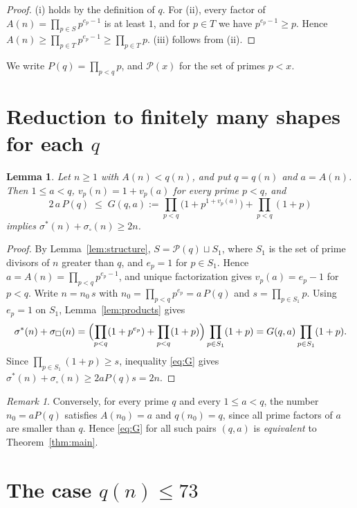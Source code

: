 \documentclass[11pt,a4paper]{amsart}
\newtheorem{lemma}[theorem]{Lemma}
\theoremstyle{definition}
\theoremstyle{remark}
\newtheorem{remark}[theorem]{Remark}
\newcommand{\usig}{\sigma^{*}}
\newcommand{\ssq}{\sigma_{\square}}
\begin{document}
\begin{proof}
(i) holds by the definition of $q$. For (ii), every factor of $A(n) = \prod_{p\in S}p^{e_p-1}$ is at least $1$, and for $p\in T$ we have $p^{e_p-1} \ge p$. Hence $A(n) \ge \prod_{p\in T}p^{e_p-1} \ge \prod_{p\in T}p$. (iii) follows from (ii).
\end{proof}

We write $P(q) = \prod_{p<q} p$, and $\mathcal{P}(x)$ for the set of primes $p<x$.

\section{Reduction to finitely many shapes for each \texorpdfstring{$q$}{q}}\label{sec:reduction}

\begin{lemma}\label{lem:reduction}
Let $n \ge 1$ with $A(n)<q(n)$, and put $q=q(n)$ and $a = A(n)$. Then $1 \le a < q$, $v_p(n) = 1 + v_p(a)$ for every prime $p<q$, and
\begin{equation}\label{eq:G}
  2\,a\,P(q) \;\le\; G(q,a) := \prod_{p<q}\bigl(1+p^{1+v_p(a)}\bigr) + \prod_{p<q}(1+p)
\end{equation}
implies $\usig(n)+\ssq(n) \ge 2n$.
\end{lemma}

\begin{proof}
By Lemma~\ref{lem:structure}, $S = \mathcal{P}(q) \sqcup S_1$, where $S_1$ is the set of prime divisors of $n$ greater than $q$, and $e_p = 1$ for $p\in S_1$. Hence $a = A(n) = \prod_{p<q}p^{e_p-1}$, and unique factorization gives $v_p(a) = e_p-1$ for $p<q$. Write $n = n_0\, s$ with $n_0 = \prod_{p<q}p^{e_p} = a\,P(q)$ and $s = \prod_{p\in S_1}p$. Using $e_p=1$ on $S_1$, Lemma~\ref{lem:products} gives
\[
  \usig(n) + \ssq(n) = \Bigl(\prod_{p<q}(1+p^{e_p}) + \prod_{p<q}(1+p)\Bigr)\prod_{p\in S_1}(1+p) = G(q,a)\prod_{p \in S_1}(1+p).
\]
Since $\prod_{p\in S_1}(1+p) \ge s$, inequality \eqref{eq:G} gives $\usig(n)+\ssq(n) \ge 2aP(q)s = 2n$.
\end{proof}

\begin{remark}
Conversely, for every prime $q$ and every $1\le a<q$, the number $n_0 = aP(q)$ satisfies $A(n_0)=a$ and $q(n_0)=q$, since all prime factors of $a$ are smaller than $q$. Hence \eqref{eq:G} for all such pairs $(q,a)$ is \emph{equivalent} to Theorem~\ref{thm:main}.
\end{remark}

\section{The case \texorpdfstring{$q(n) \le 73$}{q(n) <= 73}}\label{sec:small}
\end{document}

